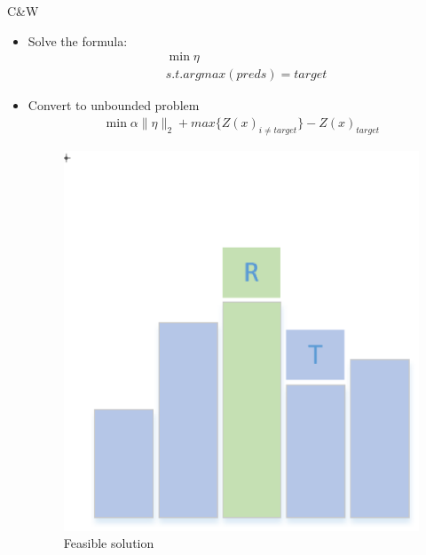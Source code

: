 \documentclass[
 size=12pt,
 paper=smartboard, %
 mode=present, %
 display=slides, %
style=tuliplab,
pauseslide,
fleqn,leqno]{powerdot}
\begin{document}
\begin{slide}{C\&W\cite{RN139}}
  \begin{itemize}
    \item Solve the formula:
      \begin{equation}
        \begin{split}
        &\min {\eta} \\
        &s.t. argmax(preds) = target
        \end{split}
      \end{equation} \pause
    \item Convert to unbounded problem \pause
    \begin{equation}
      \begin{split}
      \min {\alpha\|\eta\|_2 + max\{Z(x)_{i\neq target}\}-Z(x)_{target}}
      \end{split}
    \end{equation} \pause
    \begin{figure}[h]
      \begin{minipage}[t]{0.25\linewidth}
        \centering
        \includegraphics[width=1.0\textwidth]{figures3/feasible.eps}
        \caption{Feasible solution}
        \label{fig:feasible-solution}
      \end{minipage} 

\end{figure}
\end{itemize}
\end{slide}
\end{document}
